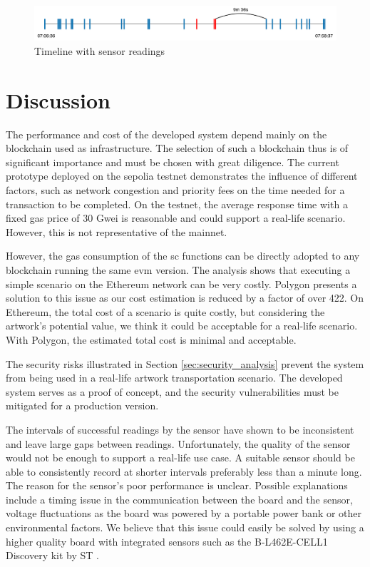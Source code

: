 \begin{figure}[ht]
    \centering
    \includegraphics[width=\textwidth]{diagrams/sensor_eval.drawio.pdf}
    \caption{Timeline with sensor readings}
    \label{fig:field_test_sensor_readings}
\end{figure}


\section{Discussion}
\label{sec:eval_discussion}
The performance and cost of the developed system depend mainly on the blockchain used as infrastructure. The selection of such a blockchain thus is of significant importance and must be chosen with great diligence. The current prototype deployed on the sepolia testnet demonstrates the influence of different factors, such as network congestion and priority fees on the time needed for a transaction to be completed. On the testnet, the average response time with a fixed gas price of 30 Gwei is reasonable and could support a real-life scenario. However, this is not representative of the mainnet.

However, the gas consumption of the \gls{sc} functions can be directly adopted to any blockchain running the same \gls{evm} version. The analysis shows that executing a simple scenario on the Ethereum network can be very costly. Polygon presents a solution to this issue as our cost estimation is reduced by a factor of over 422. On Ethereum, the total cost of a scenario is quite costly, but considering the artwork's potential value, we think it could be acceptable for a real-life scenario. With Polygon, the estimated total cost is minimal and acceptable.

The security risks illustrated in Section \ref{sec:security_analysis} prevent the system from being used in a real-life artwork transportation scenario. The developed system serves as a proof of concept, and the security vulnerabilities must be mitigated for a production version.

The intervals of successful readings by the sensor have shown to be inconsistent and leave large gaps between readings. Unfortunately, the quality of the sensor would not be enough to support a real-life use case. A suitable sensor should be able to consistently record at shorter intervals preferably less than a minute long. The reason for the sensor's poor performance is unclear. Possible explanations include a timing issue in the communication between the board and the sensor, voltage fluctuations as the board was powered by a portable power bank or other environmental factors. We believe that this issue could easily be solved by using a higher quality board with integrated sensors such as the B-L462E-CELL1 Discovery kit by ST \cite{stmdevice}. 

